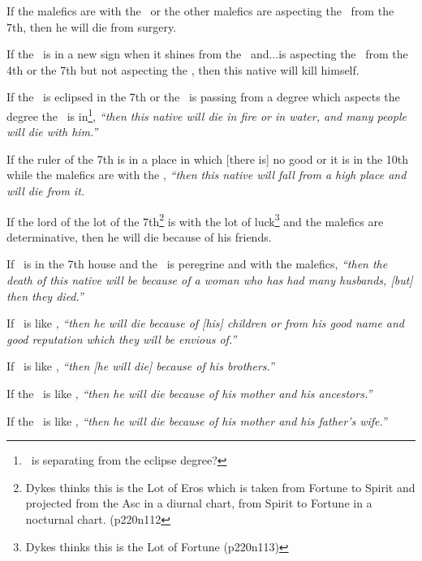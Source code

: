 If  the malefics are with the \Moon\, or the other malefics are aspecting the \Moon\, from the 7th, then he will die from surgery.

If  the \Moon\, is in a new sign when it shines from the \Sun\, and...is aspecting the \Sun\, from the 4th or the 7th but not aspecting the \Moon, then this native will kill himself.

If  the \Sun\, is eclipsed in the 7th or the \Moon\, is passing from a degree which aspects the degree the \Sun\, is in\footnote{\Moon\, is separating from the eclipse degree?}, \textsl{``then this native will die in fire or in water, and many people will die with him.''}

If  the ruler of the 7th is in a place in which [there is] no good or it is in the 10th while the malefics are with the \Moon, \textsl{``then this native will fall from a high place and will die from it.}

If  the lord of the lot of the 7th\footnote{Dykes thinks this is the Lot of Eros which is taken from Fortune to Spirit and projected from the Asc in a diurnal chart, from Spirit to Fortune in a nocturnal chart. (p220n112} is with the lot of luck\footnote{Dykes thinks this is the Lot of Fortune (p220n113)} and the malefics are determinative, then he will die because of his friends.

If  \Venus\, is in the 7th house and the \Moon\, is peregrine and with the malefics, \textsl{``then the death of this native will be because of a woman who has had many husbands, [but] then they died.''}

If  \Jupiter\, is like \Venus, \textsl{``then he will die because of [his] children or from his good name and good reputation which they will be envious of.''}

If  \Mars\, is like \Venus, \textsl{``then [he will die] because of his brothers.''}

If  the \Sun\, is like \Venus, \textsl{``then he will die because of his mother and his ancestors.''}

If  the \Moon\, is like \Venus, \textsl{``then he will die because of his mother and his father's wife.''}



